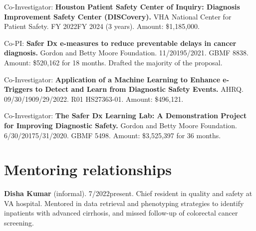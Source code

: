 \documentclass[10pt]{article}
\begin{document}
Co-Investigator: \textbf{Houston Patient Safety Center of Inquiry:
  Diagnosis Improvement Safety Center (DISCovery).} VHA National
Center for Patient Safety. FY 2022\ndash{}FY 2024 (3 years). Amount:
\$1,185,000.






Co-PI: \textbf{Safer Dx e-measures to reduce preventable delays in
  cancer diagnosis.} Gordon and Betty Moore Foundation.
11/2019\ndash{}5/2021. GBMF 8838. Amount: \$520,162 for 18 months.
Drafted the majority of the proposal.

Co-Investigator: \textbf{Application of a Machine Learning to Enhance
  e-Triggers to Detect and Learn from Diagnostic Safety Events.} AHRQ.
09/30/19\ndash{}09/29/2022. R01 HS27363-01. Amount: \$496,121.

Co-Investigator: \textbf{The Safer Dx Learning Lab: A Demonstration
  Project for Improving Diagnostic Safety.} Gordon and Betty Moore
Foundation. 6/30/2017\ndash{}5/31/2020. GBMF 5498. Amount: \$3,525,397
for 36 months.




\section*{Mentoring relationships}

\textbf{Disha Kumar} (informal). 7/2022\ndash{}present. Chief resident
in quality and safety at VA hospital. Mentored in data retrieval and
phenotyping strategies to identify inpatients with advanced cirrhosis,
and missed follow-up of colorectal cancer screening.
\end{document}
